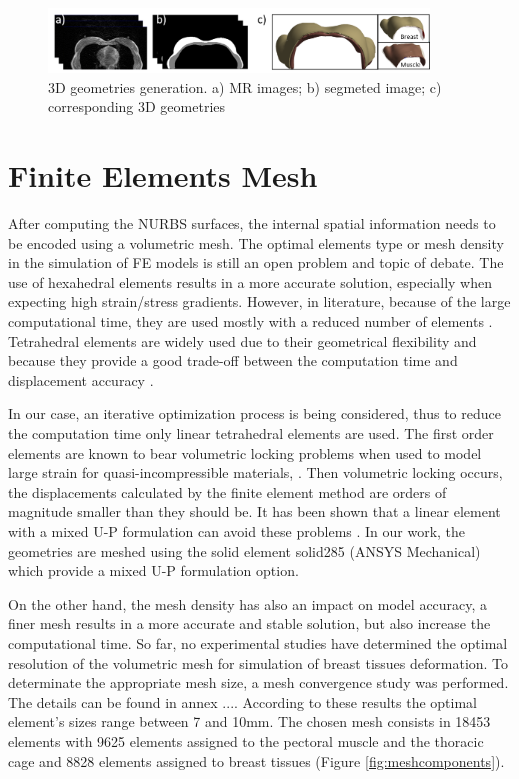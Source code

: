 \begin{figure}[!h]
\centering
\includegraphics[width=0.9\textwidth,keepaspectratio]{figures/3dgeometries.png} 
\caption{3D geometries generation. a) MR images; b) segmeted image; c) corresponding 3D geometries} \label{fig:3dgeometries}
\end{figure}

\section{ Finite Elements Mesh}\label{section:myFEM}

After computing the NURBS surfaces, the internal spatial information needs to be encoded using a volumetric mesh. The optimal elements type or mesh density in the simulation of FE models is still an open problem and topic of debate. The use of hexahedral elements results in a more accurate solution, especially when expecting high strain/stress gradients. However, in literature, because of the large computational time, they are used mostly with a reduced number of elements \citep{ruiter_model_based_2006,gamage_modelling_2012}. Tetrahedral elements are widely used due to their geometrical flexibility and because they provide a good trade-off between the computation time and displacement accuracy \citep{han_nonlinear_2014,palomar_finite_2008,griesenauer_breast_2017}.   

In our case, an iterative optimization process is being considered, thus to reduce the computation time only linear tetrahedral elements are used. The first order elements are known to bear volumetric locking problems when used to model large strain for quasi-incompressible materials, \citep{fung_classical_2017}. Then volumetric locking occurs, the displacements calculated by the finite element method are orders of magnitude smaller than they should be. It has been shown that a linear element with a mixed U-P formulation can avoid these problems \citep{rohan_finite_2014}. In our work, the geometries are meshed using the solid element solid285 (ANSYS Mechanical) which provide a mixed U-P formulation option. 

 On the other hand, the mesh density has also an impact on model accuracy, a finer mesh results in a more accurate and stable solution, but also increase the computational time. So far, no experimental studies have determined the optimal resolution of the volumetric mesh for simulation of breast tissues deformation. To determinate the appropriate mesh size, a mesh convergence study was performed. The details can be found in annex ....  According to these results the optimal element’s sizes range between 7 and 10mm. The chosen mesh consists in 18453 elements with 9625 elements assigned to the pectoral muscle and the thoracic cage and 8828 elements assigned to breast tissues (Figure \ref{fig:meshcomponents}).
 

